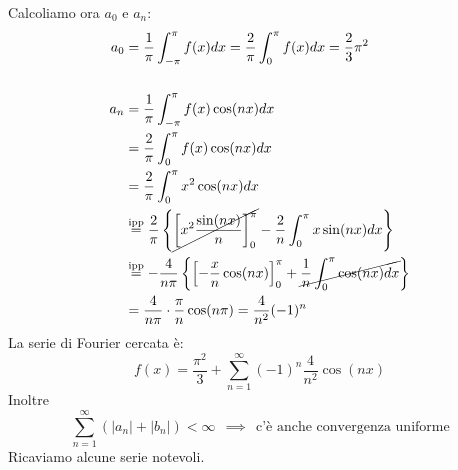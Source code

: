 Calcoliamo ora $a_{0}$ e $a_{n}$:
\begin{align*}
a_{0} & = \frac{1}{\pi}\int^{\pi}_{- \pi} f(x)dx = \frac{2}{\pi}\int^{\pi}_{0} f(x)dx = \frac{2}{3} \pi^{2}\\
 & \\
a_{n} & = \frac{1}{\pi}\int^{\pi}_{- \pi} f(x)\cos(nx) dx\\
 & = \frac{2}{\pi}\int^{\pi}_{0} f(x)\cos (nx)dx\\
 & = \frac{2}{\pi}\int^{\pi}_{0} x^{2}\cos (nx)dx\\
 & \overset{\text{ipp}}{=}\frac{2}{\pi}\left\{\cancel{\left[ x^{2}\frac{\sin (nx)}{n}\right]^{\pi}_{0}} - \frac{2}{n}\int^{\pi}_{0} x\sin (nx)dx\right\}\\
 & \overset{\text{ipp}}{=} - \frac{4}{n\pi}\left\{\left[ - \frac{x}{n}\cos(nx)\right]^{\pi}_{0} + \cancel{\frac{1}{n}\int^{\pi}_{0}\cos(nx) dx}\right\}\\
 & = \frac{4}{n\pi} \cdot \frac{\pi}{n}\cos(n\pi) = \frac{4}{n^{2}}(- 1)^{n}
\end{align*}
La serie di Fourier cercata è:
\begin{equation*}
f(x) = \frac{\pi^{2}}{3} + \sum^{\infty}_{n = 1} (- 1)^{n}\frac{4}{n^{2}}\cos (nx)
\end{equation*}
Inoltre
\begin{equation*}
\sum^{\infty}_{n = 1}(|a_{n} | + |b_{n} |) < \infty \ \ \implies \ \ \text{c'è anche convergenza uniforme}
\end{equation*}
Ricaviamo alcune serie notevoli.
